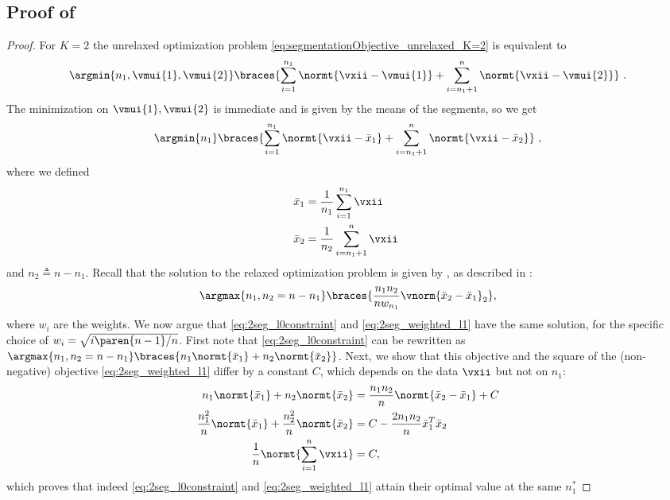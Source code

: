 \subsection{Proof of }\label{sec:proof_lem:weighted_solution_l0_l1}
\begin{proof}
For $K=2$ the unrelaxed optimization problem \eqref{eq:segmentationObjective_unrelaxed_K=2} is equivalent to
\begin{align*}
    \argmin{n_1,\vmui{1},\vmui{2}}\braces{\sum_{i=1}^{n_1}\normt{\vxii-\vmui{1}}+\sum_{i=n_1+1}^{n}\normt{\vxii-\vmui{2}}}~.
\end{align*}
The minimization on $\vmui{1},\vmui{2}$ is immediate and is given by the means of the segments, so we get
\begin{align}\label{eq:2seg_l0constraint}
    \argmin{n_1}\braces{\sum_{i=1}^{n_1}\normt{\vxii-\bar{x}_1}+\sum_{i=n_1+1}^{n}\normt{\vxii-\bar{x}_2}}~,
\end{align}
where we defined
\begin{align*}
\bar{x}_1&=\frac{1}{n_1}\sum_{i=1}^{n_1}\vxii\\
\bar{x}_2&=\frac{1}{n_2}\sum_{i=n_1+1}^{n}\vxii~
\end{align*}
and $n_2\triangleq n-n_1$.
Recall that the solution to the relaxed optimization problem is given by , as described in :
\begin{align}\label{eq:2seg_weighted_l1}
    \argmax{n_1,n_2=n-n_1}\braces{\frac{n_1 n_2}{nw_{n_1}}\vnorm{\bar{x}_2-\bar{x}_1}_2},
\end{align}
where $w_i$ are the weights. We now argue that \eqref{eq:2seg_l0constraint} and \eqref{eq:2seg_weighted_l1} have the same solution, for the specific choice of $w_i=\sqrt{i\paren{n-1}/n}$. First note that \eqref{eq:2seg_l0constraint} can be rewritten as $\argmax{n_1,n_2=n-n_1}\braces{n_1\normt{\bar{x}_1}+n_2\normt{\bar{x}_2}}$. Next, we show that this objective and the square of the (non-negative) objective \eqref{eq:2seg_weighted_l1} differ by a constant $C$, which depends on the data $\vxii$ but not on $n_1$:
\begin{align*}
    n_1\normt{\bar{x}_1}+n_2\normt{\bar{x}_2}&=\frac{n_1 n_2}{n}\normt{\bar{x}_2-\bar{x}_1}+C\\
    \frac{n_1^2}{n}\normt{\bar{x}_1}+\frac{n_2^2}{n}\normt{\bar{x}_2}&=C-\frac{2n_1 n_2}{n}\bar{x}_1^T\bar{x}_2\\
    \frac{1}{n}\normt{\sum_{i=1}^n\vxii}&=C,
\end{align*}
which proves that indeed  \eqref{eq:2seg_l0constraint} and \eqref{eq:2seg_weighted_l1} attain their optimal value at the same $n_1^*$
\end{proof}\QED
\newpage
